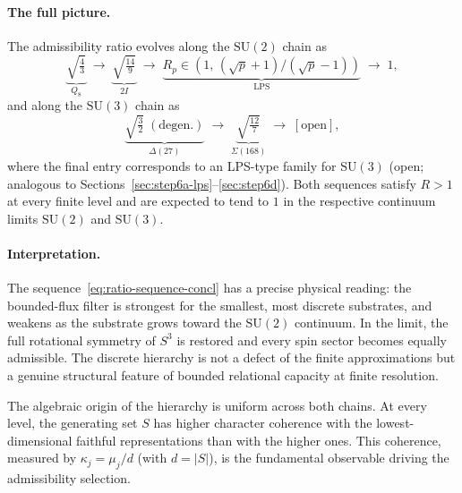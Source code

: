 \documentclass[11pt,a4paper]{article}
\begin{document}
  \paragraph{The full picture.}
    The admissibility ratio evolves along the $\mathrm{SU}(2)$ chain as
    \begin{equation}
      \underbrace{\sqrt{\tfrac{4}{3}}}_{\displaystyle Q_8}
      \;\longrightarrow\;
      \underbrace{\sqrt{\tfrac{14}{9}}}_{\displaystyle 2I}
      \;\longrightarrow\;
      \underbrace{R_p \in (1,\,(\sqrt{p}+1)/(\sqrt{p}-1))}_{\displaystyle
      \mathrm{LPS}}
      \;\longrightarrow\;
      1,
      \label{eq:ratio-sequence-concl}
    \end{equation}
    and along the $\mathrm{SU}(3)$ chain as
    \begin{equation}
      \underbrace{\sqrt{\tfrac{3}{2}}\;(\text{degen.})}_{\displaystyle \Delta(27)}
      \;\longrightarrow\;
      \underbrace{\sqrt{\tfrac{12}{7}}}_{\displaystyle \Sigma(168)}
      \;\longrightarrow\;
      [\text{open}],
      \label{eq:ratio-sequence-su3-concl}
    \end{equation}
    where the final entry corresponds to an LPS-type family for $\mathrm{SU}(3)$
    (open; analogous to Sections~\ref{sec:step6a-lps}--\ref{sec:step6d}).
    Both sequences satisfy $R > 1$ at every finite level and are expected to tend to $1$
    in the respective continuum limits $\mathrm{SU}(2)$ and $\mathrm{SU}(3)$.

  \paragraph{Interpretation.}
    The sequence~\eqref{eq:ratio-sequence-concl} has a precise physical
    reading: the bounded-flux filter is strongest for the smallest,
    most discrete substrates, and weakens as the substrate grows toward the
    $\mathrm{SU}(2)$ continuum.
    In the limit, the full rotational symmetry of $S^3$ is restored and
    every spin sector becomes equally admissible.
    The discrete hierarchy is not a defect of the finite approximations
    but a genuine structural feature of bounded relational capacity at
    finite resolution.

    The algebraic origin of the hierarchy is uniform across both chains.
    At every level, the generating set $S$ has higher character coherence
    with the lowest-dimensional faithful representations than with the higher ones.
    This coherence, measured by $\kappa_j = \mu_j/d$ (with $d = |S|$), is the
    fundamental observable driving the admissibility selection.
\end{document}
